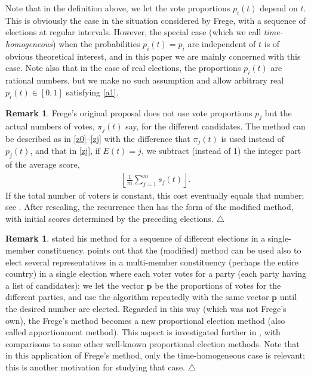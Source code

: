 \documentclass[11pt,reqno,tbtags,a4paper]{amsart}
\numberwithin{equation}{section}
\theoremstyle{plain}%
\theoremstyle{definition}
\newcommand\xqed[1]{%
    \leavevmode\unskip\penalty9999 \hbox{}\nobreak\hfill
    \quad\hbox{#1}}
\newtheorem{remarkqqq}[theorem]{Remark}
\newenvironment{remark}{\begin{remarkqqq}}
  {\xqed{$\triangle$}\end{remarkqqq}}
\theoremstyle{remark}
\newcommand{\sumjm}{\sum_{j=1}^m}
\newcommand\oi{\ensuremath{[0,1]}}
\newcommand\vp{\mathbf{p}}
\newcommand\0{{\boldsymbol 0}}
\newcommand\1{{\boldsymbol 1}}
\begin{document}
Note that in the definition above, we let the vote proportions $p_i(t)$
depend on $t$.
This is obviously the case in the situation considered by Frege,
with a sequence of elections at regular intervals.
However, the special case (which we call \emph{time-homogeneous})
when the probabilities $p_i(t)=p_i$ are independent of $t$ is of obvious
theoretical interest, 
and in this paper we are mainly concerned with this case.
Note also that in the case of real elections, the proportions $p_i(t)$ are
rational numbers, but we make no such assumption and allow arbitrary 
real $p_i(t)\in\oi$ satisfying \eqref{a1}.

\begin{remark}\label{RFrege}
  Frege's original proposal \cite{Frege} does not use vote proportions $p_j$
  but the actual numbers of votes, $\pi_j(t)$ say, for the different candidates.
The method can be described as in \eqref{z0}--\eqref{zj} with the difference
that $\pi_j(t)$ is used instead of $p_j(t)$, and that in \eqref{zj}, if
$E(t)=j$, we subtract (instead of 1) the integer part of the average score,
\begin{align}
 \left\lfloor\frac 1m \sumjm s_j(t)\right\rfloor.
\end{align}
If the total number of voters is constant, this cost eventually equals
that number; see \cite[Lemma~1]{HLL}. After rescaling, the recurrence then
has the form of the modified method, with initial scores determined by
the preceding elections.
\end{remark}

\begin{remark}\label{Rprop}
  \citet{Frege} stated his method for a sequence of different elections in a
  single-member constituency.
\citet{HLL} points out that the (modified) method can be used also to elect
several representatives in a multi-member constituency (perhaps the entire
country) in a single election where each voter votes for a party
(each party having a list of candidates):
we let the vector $\vp$ be the proportions of votes for the different parties,
and use the algorithm repeatedly with the same vector $\vp$ until the
desired number are elected. 
Regarded in this way (which was not Frege's own), the  Frege's  method
becomes a new proportional election method (also called apportionment method).
This aspect is investigated further in \cite{HLL}, with comparisons to 
some other well-known proportional election methods.
Note that in this application of Frege's method,
only the time-homogeneous case is relevant; 
this is another motivation for studying that case.
\end{remark}
\end{document}
